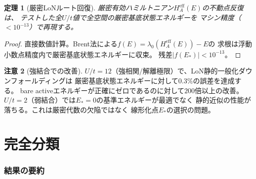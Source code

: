 \documentclass[12pt]{article}
\theoremstyle{plain}
\newtheorem{theorem}{定理}[section]
\theoremstyle{definition}
\newtheorem{remark}[theorem]{注意}
\numberwithin{equation}{section}
\newcommand{\eff}{\mathrm{eff}}
\begin{document}
\begin{theorem}[厳密LoNルート回復]\label{thm:recovery}
厳密有効ハミルトニアン$H_A^{\eff}(E)$の不動点反復は、
テストした全$U/t$値で全空間の厳密基底状態エネルギーを
マシン精度（$<10^{-13}$）で再現する。
\end{theorem}

\begin{proof}
直接数値計算。Brent法による$f(E)=\lambda_0(H_A^{\eff}(E))-E$の
求根は浮動小数点精度内で厳密基底状態エネルギーに収束。
残差$|f(E_*)|<10^{-13}$。
\end{proof}

\begin{remark}[強結合での改善]
$U/t=12$（強相関/解離極限）で、LoN静的一般化ダウンフォールディングは
厳密基底状態エネルギーに対して$0.3\%$の誤差を達成する。
bare activeエネルギーが正確にゼロであるのに対して$200$倍以上の改善。
$U/t=2$（弱結合）では$E_*=0$の基準エネルギーが最適でなく
静的近似の性能が落ちる。これは厳密代数の欠陥ではなく
線形化点$E_*$の選択の問題。
\end{remark}


\part{完全分類}

\section{結果の要約}\label{sec:summary}
\end{document}
